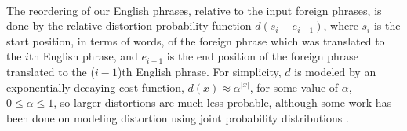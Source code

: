  \paragraph{}{The reordering of our English phrases, relative to the
   input foreign phrases, is done by the relative distortion
   probability function $d(s_i - e_{i -1})$, where $s_i$ is the start
   position, in terms of words, of the foreign phrase which was
   translated to the $i$th English phrase, and $e_{i-1}$ is the end
   position of the foreign phrase translated to the ($i-1$)th English
   phrase. For simplicity, $d$ is modeled by an exponentially decaying
   cost function, $d(x) \approx \alpha^{|x|}$, for some value of
   $\alpha$, $ 0 \leq \alpha \leq 1$, so larger distortions are much
   less probable, although some work has been done on modeling
   distortion using joint probability distributions \cite{wong}.}

